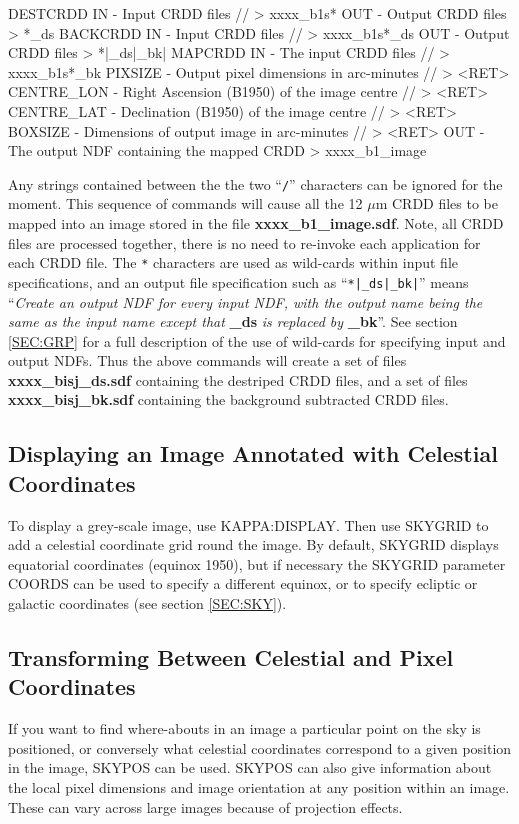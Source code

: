 \documentclass[11pt,nolof,noabs]{starlink}
\begin{document}
\small
\begin{terminalv}
DESTCRDD
  IN - Input CRDD files // > xxxx_b1s*
  OUT - Output CRDD files > *_ds
BACKCRDD
  IN - Input CRDD files // > xxxx_b1s*_ds
  OUT - Output CRDD files > *|_ds|_bk|
MAPCRDD
  IN - The input CRDD files // > xxxx_b1s*_bk
  PIXSIZE - Output pixel dimensions in arc-minutes // > <RET>
  CENTRE_LON - Right Ascension (B1950) of the image centre // > <RET>
  CENTRE_LAT - Declination (B1950) of the image centre // > <RET>
  BOXSIZE - Dimensions of output image in arc-minutes // > <RET>
  OUT - The output NDF containing the mapped CRDD > xxxx_b1_image
\end{terminalv}
\normalsize

Any strings contained between the the two ``\verb+/+'' characters can be ignored
for the moment.
This sequence of commands will cause all the 12 $\mu$m {\small CRDD} files to be
mapped into an image stored in the file \textbf{xxxx\_b1\_image.sdf}. Note, all
{\small CRDD} files are processed together, there is no need to  re-invoke each
application for each {\small CRDD} file. The \verb+*+ characters are used as
wild-cards within input file specifications, and an output file specification
such as ``\verb+*|_ds|_bk|+'' means ``\emph{Create an output {\small NDF} for
every input {\small NDF}, with the output name being the same as the input name
except that} \textbf{\_ds} \emph{is replaced by} \textbf{\_bk}''. See section
\ref{SEC:GRP} for a full description of the use of wild-cards for specifying
input and output {\small NDF}s. Thus the above commands will create a set of
files \textbf{xxxx\_bisj\_ds.sdf} containing the destriped {\small CRDD} files, and
a set of files \textbf{xxxx\_bisj\_bk.sdf} containing the background subtracted
{\small CRDD} files.

\subsection{Displaying an Image Annotated with Celestial Coordinates}
To display a grey-scale image, use {\small KAPPA:DISPLAY}. Then use {\small
SKYGRID} to add a celestial coordinate grid round the image. By default,
SKYGRID displays equatorial coordinates (equinox 1950), but if necessary the
SKYGRID parameter COORDS can be used to specify a different equinox, or to
specify ecliptic or galactic coordinates (see section \ref{SEC:SKY}).

\subsection{Transforming Between Celestial and Pixel Coordinates}
If you want to find where-abouts in an image a particular point on the sky is
positioned, or conversely what celestial coordinates correspond to a given
position in the image, {\small SKYPOS} can be used. {\small SKYPOS} can also
give information about the local pixel dimensions and image orientation at any
position within an image. These can vary across large images because of
projection effects.
\end{document}
